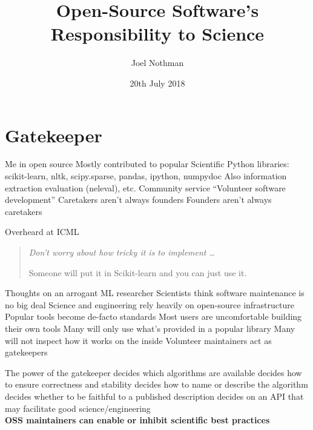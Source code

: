 \documentclass[aspectratio=169, 22pt]{beamer}
\title{Open-Source Software's Responsibility to Science}
\subtitle{}
\date{20th July 2018}
\author{Joel Nothman}
\newcommand{\hl}{\textcolor{usydred}}
\begin{document}
\titleslide

\section{Gatekeeper}

\begin{points}{Me in open source}
	\p Mostly contributed to popular Scientific Python libraries:\\
	scikit-learn, nltk, scipy.sparse, pandas, ipython, numpydoc
	\p Also information extraction evaluation (neleval), etc.
	\vfill
	\p Community service
	\p ``Volunteer software development''
	\vfill
	\p Caretakers aren't always founders
	\p Founders aren't always caretakers
\end{points}

\begin{centre}{Overheard at ICML}
	\begin{quote}
		\Large
		\it
	Don't worry about how tricky it is to implement \ldots

	\vspace{2em}

	\raggedleft Someone will put it in Scikit-learn and you can just use it.
	\end{quote}
\end{centre}

\begin{points}{Thoughts on an arrogant ML researcher}
	\p Scientists think software maintenance is no big deal
	\pause
	\p Science and engineering rely heavily on open-source infrastructure
	\p Popular tools become de-facto standards
	\vfill
	\p Most users are uncomfortable building their own tools
	\p Many will only use what's provided in a popular library
	\p Many will not inspect how it works on the inside
	\vfill
	\p Volunteer maintainers act as gatekeepers
\end{points}

\begin{points}{The power of the gatekeeper}
	\p decides \hl{which algorithms} are available
	\p decides how to ensure \hl{correctness} and stability
	\p decides how to \hl{name} or describe the algorithm
	\p decides whether to be \hl{faithful} to a published description
	\p decides on an \hl{API} that may facilitate good science/engineering
	\\
	\pause
	\vspace{2em}
	\hl{\bf OSS maintainers can enable or inhibit scientific best practices}
\end{points}
\end{document}
